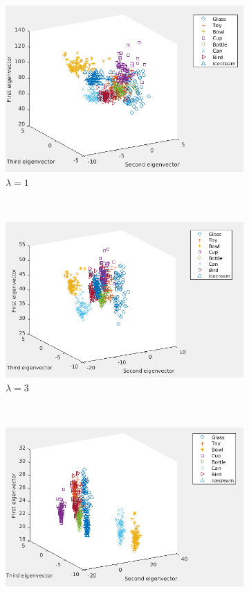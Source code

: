 \documentclass[10pt,a4paper]{article}
\begin{document}
\begin{figure}[H]
	\centering
	\begin{subfigure}[b]{0.45\textwidth}
		\includegraphics[width= \textwidth]{images/Laplace-lam1.png}
		\caption{$\lambda=1$}
		\label{}
	\end{subfigure}~
	\begin{subfigure}[b]{0.45\textwidth}
		\includegraphics[width= \textwidth]{images/Laplace-lam2.png}
		\caption{$\lambda=3$}
		\label{}
	\end{subfigure}\\
	\begin{subfigure}[b]{0.45\textwidth}
		\includegraphics[width= \textwidth]{images/Laplace-lam4.png}

\end{subfigure}
\end{figure}
\end{document}
